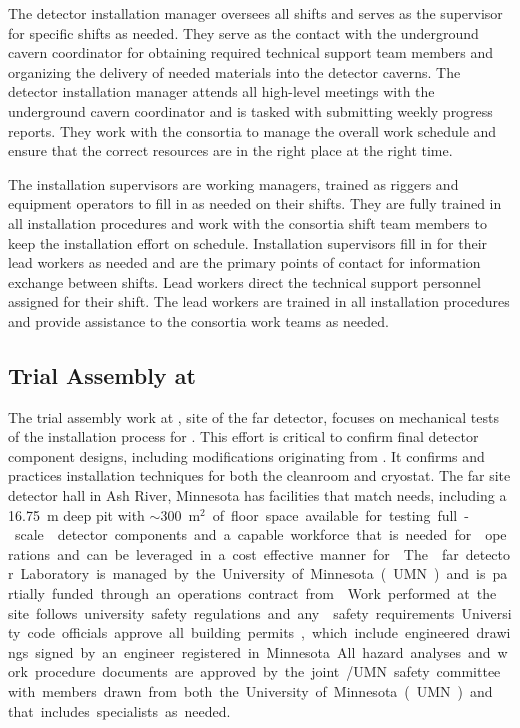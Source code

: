 The detector installation manager oversees all shifts and serves as
the supervisor for specific shifts as needed.  They serve as the
contact with the underground cavern coordinator for obtaining
required technical support team members and organizing the delivery of
needed materials into the detector caverns.  The detector installation
manager attends all high-level meetings with the underground cavern
coordinator and is tasked with submitting weekly progress reports.
They work with the  consortia to manage the overall work
schedule and ensure that the correct resources are in the right place
at the right time.
    
The installation supervisors are working managers, trained as riggers
and equipment operators to fill in as needed on their shifts.  They
are fully trained in all installation procedures and work with the
consortia shift team members to keep the installation effort on
schedule.  Installation supervisors fill in for their lead workers as
needed and are the primary points of contact for information exchange
between shifts.  Lead workers direct the technical support personnel
assigned for their shift.  The lead workers are trained in all
installation procedures and provide assistance to the consortia work
teams as needed.

\subsection{Trial Assembly at }

The trial assembly work at , site of the 
far detector, focuses on mechanical tests of the installation
process for . This effort is critical to confirm final
detector component designs, including modifications originating from
. It confirms and practices installation techniques
for both the cleanroom and cryostat.  The  far site
detector hall in Ash River, Minnesota has facilities that
match  needs, including a \SI{16.75}{m} deep pit with
$\sim$\SI{300}{m$^2$} of floor space available for testing full-scale
 detector components and a capable workforce that is
needed for  operations and can be leveraged in a cost effective
manner for .  The  far detector Laboratory is
managed by the University of Minnesota (UMN) and is partially funded
through an operations contract from .  Work performed at
the  site follows university safety regulations and
any  safety requirements University code officials approve
all building permits, which include engineered drawings signed by an
engineer registered in Minnesota. All hazard analyses and work
procedure documents are approved by the joint /UMN safety
committee with members drawn from both the University of Minnesota
(UMN) and  that includes specialists as needed.

